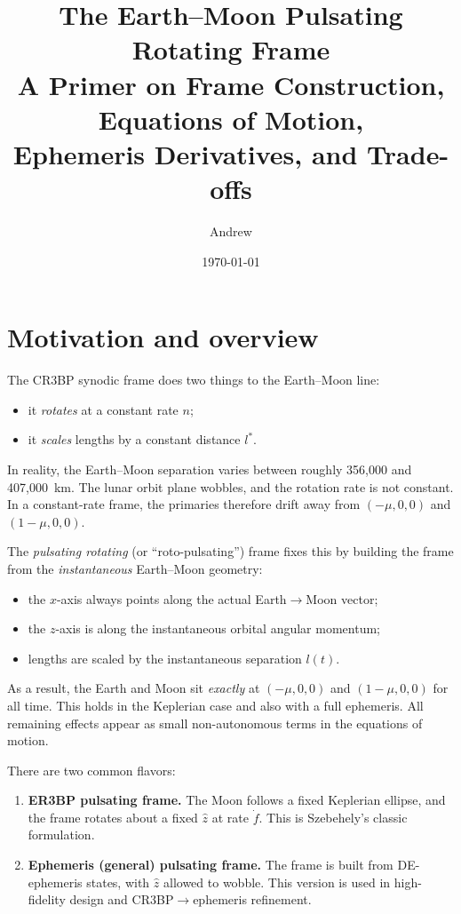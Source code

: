 \documentclass[11pt]{article}
\title{The Earth--Moon Pulsating Rotating Frame\\
\large A Primer on Frame Construction, Equations of Motion,\\
Ephemeris Derivatives, and Trade-offs}
\author{Andrew}
\date{\today}
\begin{document}
\maketitle
\tableofcontents
\clearpage

\section{Motivation and overview}

The CR3BP synodic frame does two things to the Earth--Moon line:
\begin{itemize}
  \item it \emph{rotates} at a constant rate $n$;
  \item it \emph{scales} lengths by a constant distance $l^*$.
\end{itemize}

In reality, the Earth--Moon separation varies between roughly 356{,}000 and 407{,}000~km. The lunar orbit plane wobbles, and the rotation rate is not constant. In a constant-rate frame, the primaries therefore drift away from $(-\mu,0,0)$ and $(1-\mu,0,0)$.

The \emph{pulsating rotating} (or ``roto-pulsating'') frame fixes this by building the frame from the \emph{instantaneous} Earth--Moon geometry:
\begin{itemize}
  \item the $x$-axis always points along the actual Earth$\to$Moon vector;
  \item the $z$-axis is along the instantaneous orbital angular momentum;
  \item lengths are scaled by the instantaneous separation $l(t)$.
\end{itemize}

As a result, the Earth and Moon sit \emph{exactly} at $(-\mu,0,0)$ and $(1-\mu,0,0)$ for all time. This holds in the Keplerian case and also with a full ephemeris. All remaining effects appear as small non-autonomous terms in the equations of motion.

There are two common flavors:
\begin{enumerate}
  \item \textbf{ER3BP pulsating frame.} The Moon follows a fixed Keplerian ellipse, and the frame rotates about a fixed $\hat z$ at rate $\dot f$. This is Szebehely's classic formulation.
  \item \textbf{Ephemeris (general) pulsating frame.} The frame is built from DE-ephemeris states, with $\hat z$ allowed to wobble. This version is used in high-fidelity design and CR3BP$\to$ephemeris refinement.
\end{enumerate}
\end{document}
